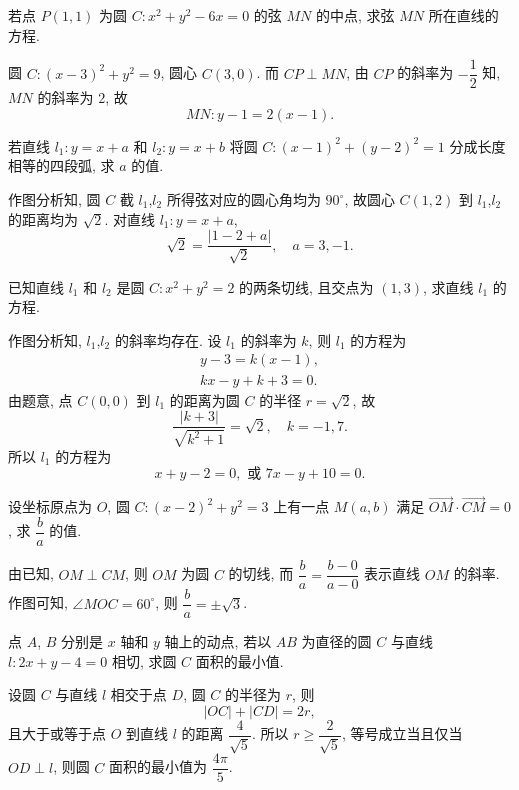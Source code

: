 \begin{exercise}
    若点 $P(1,1)$ 为圆 $C\colon x^2 +y^2 -6x=0$ 的弦 $MN$ 的中点, 求弦 $MN$ 所在直线的方程.
\end{exercise}
\beginsolution
    圆 $C\colon (x-3)^2+y^2= 9$, 圆心 $C(3,0)$. 而 $CP\perp MN$, 由 $CP$ 的斜率为 $-\dfrac12$ 知, $MN$ 的斜率为 $2$, 故
    \[MN\colon y-1= 2(x-1).\]
\endsolution

\begin{exercise}
    若直线 $l_1\colon y=x+a$ 和 $l_2\colon y=x+b$ 将圆 $C\colon (x-1)^2 +(y-2)^2 =1$ 分成长度相等的四段弧, 求 $a$ 的值.
\end{exercise}
\beginsolution
    作图分析知, 圆 $C$ 截 $l_1$,$l_2$ 所得弦对应的圆心角均为 $90^\circ$, 故圆心 $C(1,2)$ 到 $l_1$,$l_2$ 的距离均为 $\sqrt2$. 对直线 $l_1\colon y=x+a$, 
    \[\sqrt{2}= \frac{|1-2+a|}{\sqrt2},\quad a=3,-1.\] 
\endsolution

\begin{exercise}
    已知直线 $l_1$ 和 $l_2$ 是圆 $C\colon x^2 +y^2 =2$ 的两条切线, 且交点为 $(1,3)$, 求直线 $l_1$ 的方程.
\end{exercise}
\beginsolution
    作图分析知, $l_1$,$l_2$ 的斜率均存在. 设 $l_1$ 的斜率为 $k$, 则 $l_1$ 的方程为
    \[\begin{gathered}
        y-3= k(x-1),\\
        kx- y+ k+ 3= 0.
    \end{gathered}\]
    由题意, 点 $C(0,0)$ 到 $l_1$ 的距离为圆 $C$ 的半径 $r=\sqrt 2$, 故
    \[\frac{|k+3|}{\sqrt{k^2+1}}= \sqrt2,\quad k=-1,7.\]
    所以 $l_1$ 的方程为
    \[x+y-2= 0,\text{\ 或\ } 7x-y+10= 0.\]
\endsolution

\begin{exercise}
    设坐标原点为 $O$, 圆 $C\colon (x-2)^2 +y^2 =3$ 上有一点 $M(a,b)$ 满足 $\overrightarrow{OM}\cdot\overrightarrow{CM}=0$, 求 $\dfrac{b}a$ 的值.
\end{exercise}
\beginsolution
    由已知, $OM\perp CM$, 则 $OM$ 为圆 $C$ 的切线, 
    而 $\dfrac{b}a= \dfrac{b-0}{a-0}$ 表示直线 $OM$ 的斜率. 作图可知, $\angle MOC= 60^\circ$, 则 $\dfrac{b}a= \pm\sqrt3$.
\endsolution

\begin{exercise}
    点 $A$, $B$ 分别是 $x$ 轴和 $y$ 轴上的动点, 若以 $AB$ 为直径的圆 $C$ 与直线 $l\colon 2x+y-4= 0$ 相切, 求圆 $C$ 面积的最小值.
\end{exercise}
\beginsolution
    设圆 $C$ 与直线 $l$ 相交于点 $D$, 圆 $C$ 的半径为 $r$, 则
    \[|OC|+ |CD|= 2r,\]
    且大于或等于点 $O$ 到直线 $l$ 的距离 $\dfrac4{\sqrt5}$. 所以 $r\geqslant \dfrac2{\sqrt5}$, 等号成立当且仅当 $OD\perp l$, 则圆 $C$ 面积的最小值为 $\dfrac{4\pi}5$.
\endsolution

